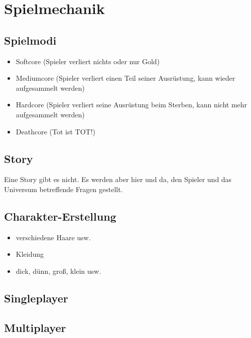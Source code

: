 \section{Spielmechanik}
\label{sec:spielmechanik}

\subsection{Spielmodi}
\label{subsec:spielmodi}
	\begin{itemize}
		\item Softcore (Spieler verliert nichts oder nur Gold)
		\item Mediumcore (Spieler verliert einen Teil seiner Ausrüstung, kann wieder aufgesammelt werden)
		\item Hardcore (Spieler verliert seine Ausrüstung beim Sterben, kann nicht mehr aufgesammelt werden)
		\item Deathcore (Tot ist TOT!)
	\end{itemize}


\subsection{Story}
\label{subsec:story}
Eine Story gibt es nicht. Es werden aber hier und da, den Spieler und das Universum betreffende Fragen gestellt.


\subsection{Charakter-Erstellung}
\label{subsec:charakter-erstellung}
	\begin{itemize}
		\item verschiedene Haare usw.
		\item Kleidung
		\item dick, dünn, groß, klein usw.
	\end{itemize}

\subsection{Singleplayer}
\label{subsec:singleplayer}

\subsection{Multiplayer}
\label{subsec:multiplayer}

